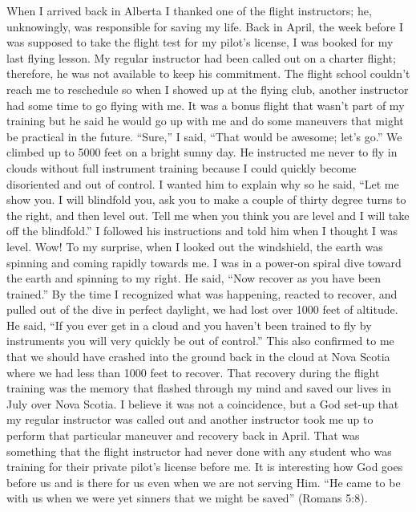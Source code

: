 \documentclass[twoside, 12pt]{book}
\begin{document}
When I arrived back in Alberta I thanked one of the flight instructors; he, unknowingly, was responsible for saving my life. Back in April, the week before I was supposed to take the flight test for my pilot’s license, I was booked for my last flying lesson. My regular instructor had been called out on a charter flight; therefore, he was not available to keep his commitment. The flight school couldn't reach me to reschedule so when I showed up at the flying club, another instructor had some time to go flying with me. It was a bonus flight that wasn’t part of my training but he said he would go up with me and do some maneuvers that might be practical in the future. “Sure,” I said, “That would be awesome; let’s go.” We climbed up to 5000 feet on a bright sunny day. He instructed me never to fly in clouds without full instrument training because I could quickly become disoriented and out of control. I wanted him to explain why so he said, “Let me show you. I will blindfold you, ask you to make a couple of thirty degree turns to the right, and then level out. Tell me when you think you are level and I will take off the blindfold.” I followed his instructions and told him when I thought I was level. Wow! To my surprise, when I looked out the windshield, the earth was spinning and coming rapidly towards me. I was in a power-on spiral dive toward the earth and spinning to my right. He said, “Now recover as you have been trained.” By the time I recognized what was happening, reacted to recover, and pulled out of the dive in perfect daylight, we had lost over 1000 feet of altitude. He said, “If you ever get in a cloud and you haven't been trained to fly by instruments you will very quickly be out of control.” This also confirmed to me that we should have crashed into the ground back in the cloud at Nova Scotia where we had less than 1000 feet to recover. That recovery during the flight training was the memory that flashed through my mind and saved our lives in July over Nova Scotia. I believe it was not a coincidence, but a God set-up that my regular instructor was called out and another instructor took me up to perform that particular maneuver and recovery back in April. That was something that the flight instructor had never done with any student who was training for their private pilot’s license before me. It is interesting how God goes before us and is there for us even when we are not serving Him. “He came to be with us when we were yet sinners that we might be saved” (Romans 5:8). 
\end{document}
